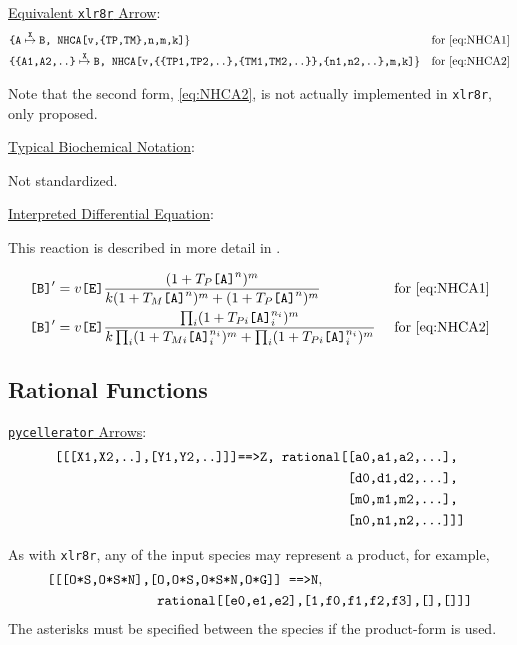 \underline{Equivalent {\tt xlr8r} Arrow}: 
\begin{align*}
&\text{\tt{\{A}}\overset{\text{\tt{X}}}{\mapsto}\text{\tt{B, }} \text{\tt{NHCA[v,\{TP,TM\},n,m,k]}}\} &\text{for \eqref{eq:NHCA1}}\\
&\text{\tt{\{\{A1,A2,..\}}}\overset{\text{\tt{X}}}{\mapsto}\text{\tt{B, }} \text{\tt{NHCA[v,\{\{TP1,TP2,..\},\{TM1,TM2,..\}\},\{n1,n2,..\},m,k]}}\}&\text{for \eqref{eq:NHCA2}}
\end{align*}

Note that the second form, \eqref{eq:NHCA2}, is not actually implemented in {\tt xlr8r}, only proposed. 

\underline{Typical Biochemical Notation}: 

Not standardized.

\underline{Interpreted Differential Equation}:

This reaction is described in more detail in \cite{ICSB2001}.

\begin{align*}
\text{\tt{[B]}}'&=v\text{\tt{[E]}}\dfrac
{(1+T_P \text{\tt{[A]}}^{n})^{m}}
{k(1+T_M\text{\tt{[A]}}^n)^{m} + (1+T_P\text{\tt{[A]}}^n)^{m}}
&\text{ for \eqref{eq:NHCA1}}
\\
\text{\tt{[B]}}'&=v\text{\tt{[E]}}\dfrac
{\prod_i(1+T_{Pi} \text{\tt{[A]}}_i^{n_i})^{m}}
{k\prod_i (1+T_{Mi}\text{\tt{[A]}}_i^{n_i})^{m} + \prod_i(1+T_{Pi}\text{\tt{[A]}}_i^{n_i})^{m}}
&\text{ for \eqref{eq:NHCA2}}
\end{align*}

\subsection{Rational Functions}
\label{subsection:Rational}
\underline{{\tt pycellerator} Arrows}:
\begin{align*}
{\text{\tt[[[X1,X2,..],[Y1,Y2,..]]]==>Z, rational[}}&{\text{\tt[a0,a1,a2,...],}}\\
&{\text{\tt[d0,d1,d2,...],}}\\
&{\text{\tt[m0,m1,m2,...],}}\\
&{\text{\tt[n0,n1,n2,...]]]}}
\end{align*}

As with {\tt xlr8r}, any of the input species may represent a product, for example, 
\begin{align*}
\text{\tt{[[[O*S,O*S*N],}}&\text{\tt{[O,O*S,O*S*N,O*G]] ==>N}},\\
&\text{\tt{ rational[[e0,e1,e2],[1,f0,f1,f2,f3],[],[]]]}}
\end{align*}
The asterisks must be specified between the species if the product-form is used.

